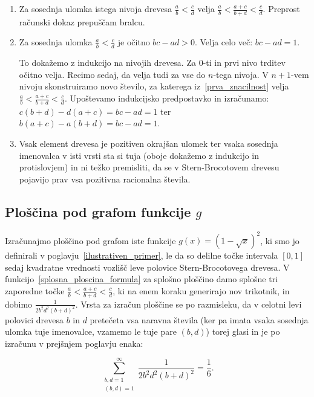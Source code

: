 \documentclass[a4paper, 12pt, titlepage]{article}
\begin{document}
\begin{enumerate}
    \item \label{prva_znacilnost}
    Za sosednja ulomka istega nivoja drevesa $ \frac{a}{b} < \frac{c}{d} $ velja $ \frac{a}{b} < \frac{a+c}{b+d} < \frac{c}{d} $. Preprost računski dokaz prepuščam bralcu.
    \item Za sosednja ulomka $ \frac{a}{b} < \frac{c}{d} $ je očitno $ bc - ad > 0 $. Velja celo več: $ bc - ad = 1 $.
    
    To dokažemo z indukcijo na nivojih drevesa. Za 0-ti in prvi nivo trditev očitno velja. Recimo sedaj, da velja tudi za vse do $ n $-tega nivoja. V $ n+1$-vem nivoju skonstruiramo novo število, za katerega iz~\ref{prva_znacilnost} velja $ \frac{a}{b} < \frac{a+c}{b+d} < \frac{c}{d} $. Upoštevamo indukcijsko predpostavko in izračunamo: $ c(b+d) - d(a+c) = bc-ad = 1 $ ter $ b(a+c) - a(b+d)  = bc-ad = 1 $.
    \item Vsak element drevesa je pozitiven okrajšan ulomek ter vsaka sosednja imenovalca v isti vrsti sta si tuja (oboje dokažemo z indukcijo in protislovjem) in ni težko premisliti, da se v Stern-Brocotovem drevesu pojavijo prav vsa pozitivna racionalna števila.
\end{enumerate}

\subsection{Ploščina pod grafom funkcije $ g $}

Izračunajmo ploščino pod grafom iste funkcije $ g(x) = (1 - \sqrt{x})^2 $, ki smo jo definirali v poglavju~\ref{ilustrativen_primer}, le da so delilne točke intervala $ [0,1] $ sedaj kvadratne vrednosti vozlišč leve polovice Stern-Brocotovega drevesa. V funkcijo~\ref{splosna_ploscina_formula} za splošno ploščino damo splošne tri zaporedne točke $ \frac{a}{b} < \frac{a+c}{b+d} < \frac{c}{d} $, ki na enem koraku generirajo nov trikotnik, in dobimo $ \frac{1}{2b^2d^2(b+d)^2} $. Vrsta za izračun ploščine se po razmisleku, da v celotni levi polovici drevesa $ b $ in $ d $ pretečeta vsa naravna števila (ker pa imata vsaka sosednja ulomka tuje imenovalce, vzamemo le tuje pare $ (b,d) $) torej glasi in je po izračunu v prejšnjem poglavju enaka:

\begin{equation}
    \sum_{\substack{b,d=1 \\ (b,d)=1}}^{\infty} \frac{1}{2b^2d^2(b+d)^2} = \frac{1}{6}\text{.}
    \label{SB_ilustrativen_primer}
\end{equation}
\end{document}

